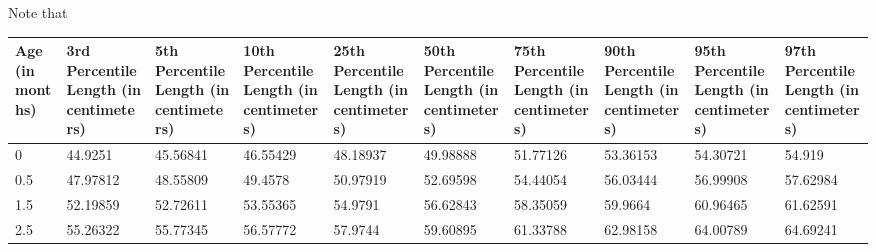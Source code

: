 \documentclass[10pt,twocolumn,letterpaper]{article}
\begin{document}
Note that 




\clearpage

\onecolumn

\begin{table}
    \begin{tabular}{llllllllll}
    Age (in months) & 3rd Percentile Length (in centimeters) & 5th Percentile Length (in centimeters) & 10th Percentile Length (in centimeters) & 25th Percentile Length (in centimeters) & 50th Percentile Length (in centimeters) & 75th Percentile Length (in centimeters) & 90th Percentile Length (in centimeters) & 95th Percentile Length (in centimeters) & 97th Percentile Length (in centimeters) \\
		\hline
    0               & 44.9251                                & 45.56841                               & 46.55429                                & 48.18937                                & 49.98888                                & 51.77126                                & 53.36153                                & 54.30721                                & 54.919                                  \\
    0.5             & 47.97812                               & 48.55809                               & 49.4578                                 & 50.97919                                & 52.69598                                & 54.44054                                & 56.03444                                & 56.99908                                & 57.62984                                \\
    1.5             & 52.19859                               & 52.72611                               & 53.55365                                & 54.9791                                 & 56.62843                                & 58.35059                                & 59.9664                                 & 60.96465                                & 61.62591                                \\
    2.5             & 55.26322                               & 55.77345                               & 56.57772                                & 57.9744                                 & 59.60895                                & 61.33788                                & 62.98158                                & 64.00789                                & 64.69241                                \\

\end{tabular}
\end{table}
\end{document}

